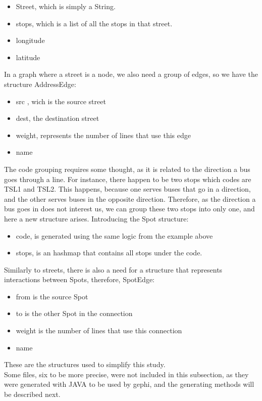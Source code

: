 \documentclass[12pt]{report}
\begin{document}
	\begin{itemize}
		\item Street, which is simply a String.
		\item stops, which is a list of all the stops in that street.
		\item longitude
		\item latitude
	\end{itemize}
	
	In a graph where a street is a node, we also need a group of edges, so we have the structure AddressEdge: 
	\begin{itemize}
		\item src , wich is the source street
		\item dest, the destination street
		\item weight, represents the number of lines that use this edge
		\item name
	\end{itemize}
	
	The code grouping requires some thought, as it is related to the direction a bus goes through a line. For instance, there happen to be two stops which codes are TSL1 and TSL2. This happens, because one serves buses that go in a direction, and the other serves buses in the opposite direction. Therefore, as the direction a bus goes in does not interest us, we can group these two stops into only one, and here a new structure arises. Introducing the Spot structure:
	
	\begin{itemize}
		\item code, is generated using the same logic from the example above
		\item stops, is an hashmap that contains all stops under the code.
	\end{itemize}
	
	Similarly to streets, there is also a need for a structure that represents interactions between Spots, therefore, SpotEdge:
	
		\begin{itemize}
			\item from is the source Spot
			\item to is the other Spot in the connection
			\item weight is the number of lines that use this connection
			\item name
		\end{itemize}
	
	These are the structures used to simplify this study.\\
	Some files, six to be more precise, were not included in this subsection, as they were generated with JAVA to be used by gephi, and the generating methods will be described next.
\end{document}
